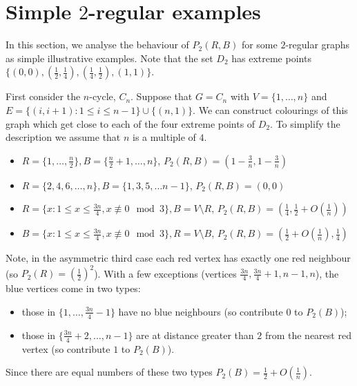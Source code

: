 \documentclass[12pt,a4paper]{article}
\begin{document}
\section{Simple $2$-regular examples}

In this section, we analyse the behaviour of $P_2(R,B)$ for some $2$-regular graphs as simple illustrative examples. Note that the set $D_2$ has extreme points $\{(0,0),(\frac{1}{2},\frac{1}{4}),(\frac{1}{4},\frac{1}{2}),(1,1)\}$. 

First consider the $n$-cycle, $C_n$. Suppose that $G=C_n$ with $V=\{1,\ldots,n\}$ and $E=\{(i,i+1) : 1\leq i\leq n-1\}\cup\{(n,1)\}$. We can construct colourings of this graph which get close to each of the four extreme points of $D_2$. To simplify the description we assume that $n$ is a multiple of $4$.
\begin{itemize}
\item $R=\{1,\ldots,\frac{n}{2}\}, B=\{\frac{n}{2}+1,\ldots,n\}$, $P_2(R,B)=\left(1-\frac{3}{n},1-\frac{3}{n}\right)$
\item $R=\{2,4,6,\ldots,n\}, B=\{1,3,5,\ldots n-1\}$, $P_2(R,B)=\left(0,0\right)$
\item $R=\{x : 1\leq x\leq \frac{3n}{4}, x\not\equiv 0 \mod 3\}, B=V\setminus R$, $P_2(R,B)=\left(\frac{1}{4},\frac{1}{2}+O\left(\frac{1}{n}\right)\right)$
\item $B=\{x : 1\leq x\leq \frac{3n}{4}, x\not\equiv 0 \mod 3\}, R=V\setminus B$, $P_2(R,B)=\left(\frac{1}{2}+O\left(\frac{1}{n}\right),\frac{1}{4}\right)$
\end{itemize}

Note, in the asymmetric third case each red vertex has exactly one red neighbour (so $P_2(R)=\left(\frac{1}{2}\right)^2$). With a few exceptions (vertices $\frac{3n}{4},\frac{3n}{4}+1,n-1,n$), the blue vertices come in two types:
\begin{itemize}
\item those in $\{1,\ldots,\frac{3n}{4}-1\}$ have no blue neighbours (so contribute $0$ to $P_2(B)$); 
\item those in $\{\frac{3n}{4}+2,\ldots,n-1\}$ are at distance greater than $2$ from the nearest red vertex (so contribute $1$ to $P_2(B)$).
\end{itemize}
Since there are equal numbers of these two types $P_2(B)=\frac{1}{2}+O(\frac{1}{n})$.
\end{document}
